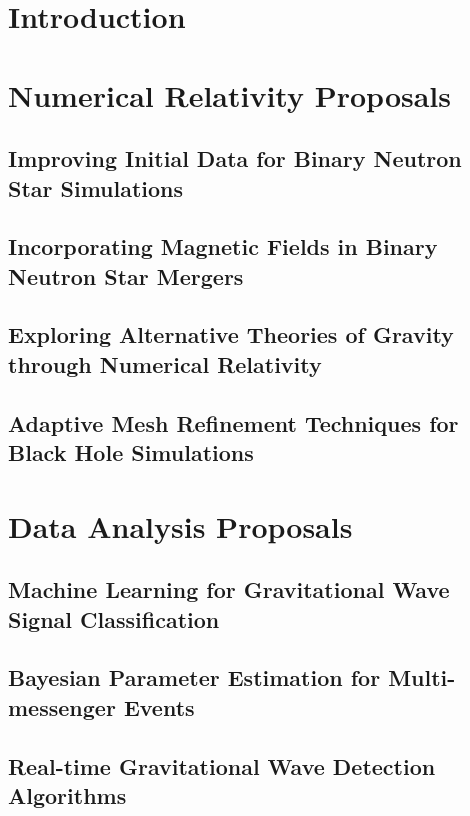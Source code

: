 \section{Introduction}\label{sec:proposals-introduction}
\section{Numerical Relativity Proposals}\label{sec:numerical-relativity-proposals}
\subsection{Improving Initial Data for Binary Neutron Star Simulations}\label{subsec:improving-initial-data-for-binary-neutron-star-simulations}
\subsection{Incorporating Magnetic Fields in Binary Neutron Star Mergers}\label{subsec:incorporating-magnetic-fields-in-binary-neutron-star-mergers}
\subsection{Exploring Alternative Theories of Gravity through Numerical Relativity}\label{subsec:exploring-alternative-theories-of-gravity-through-numerical-relativity}
\subsection{Adaptive Mesh Refinement Techniques for Black Hole Simulations}\label{subsec:adaptive-mesh-refinement-techniques-for-black-hole-simulations}
\section{Data Analysis Proposals}\label{sec:data-analysis-proposals}
\subsection{Machine Learning for Gravitational Wave Signal Classification}\label{subsec:machine-learning-for-gravitational-wave-signal-classification}
\subsection{Bayesian Parameter Estimation for Multi-messenger Events}\label{subsec:bayesian-parameter-estimation-for-multi-messenger-events}
\subsection{Real-time Gravitational Wave Detection Algorithms}\label{subsec:real-time-gravitational-wave-detection-algorithms}
